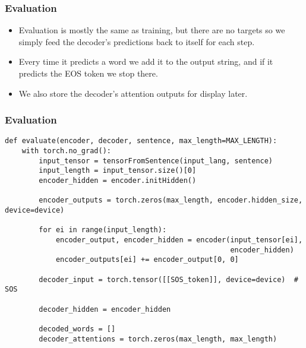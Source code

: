 \begin{frame}[fragile]
\frametitle{Evaluation}
\begin{itemize}
\item Evaluation is mostly the same as training, but there are no targets so we simply feed the decoder's predictions back to itself for each step. 
\item Every time it predicts a word we add it to the output string, and if it predicts the EOS token we stop there. 
\item We also store the decoder's attention outputs for display later.
\end{itemize}

\end{frame} 

\begin{frame}[fragile]
\frametitle{Evaluation}
\begin{lstlisting}    
def evaluate(encoder, decoder, sentence, max_length=MAX_LENGTH):
    with torch.no_grad():
        input_tensor = tensorFromSentence(input_lang, sentence)
        input_length = input_tensor.size()[0]
        encoder_hidden = encoder.initHidden()

        encoder_outputs = torch.zeros(max_length, encoder.hidden_size, device=device)

        for ei in range(input_length):
            encoder_output, encoder_hidden = encoder(input_tensor[ei],
                                                     encoder_hidden)
            encoder_outputs[ei] += encoder_output[0, 0]

        decoder_input = torch.tensor([[SOS_token]], device=device)  # SOS

        decoder_hidden = encoder_hidden

        decoded_words = []
        decoder_attentions = torch.zeros(max_length, max_length)
\end{lstlisting} 
              
\end{frame} 


